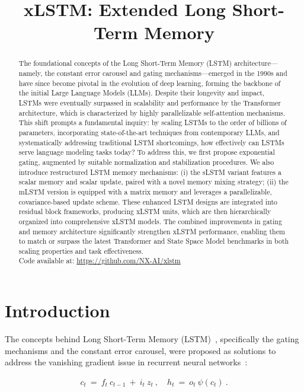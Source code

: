 \title{xLSTM: Extended Long Short-Term Memory}

\begin{abstract}
The foundational concepts of the Long Short-Term Memory (LSTM) architecture—namely, the constant error carousel and gating mechanisms—emerged in the 1990s and have since become pivotal in the evolution of deep learning, forming the backbone of the initial Large Language Models (LLMs). Despite their longevity and impact, LSTMs were eventually surpassed in scalability and performance by the Transformer architecture, which is characterized by highly parallelizable self-attention mechanisms. This shift prompts a fundamental inquiry: by scaling LSTMs to the order of billions of parameters, incorporating state-of-the-art techniques from contemporary LLMs, and systematically addressing traditional LSTM shortcomings, how effectively can LSTMs serve language modeling tasks today? To address this, we first propose exponential gating, augmented by suitable normalization and stabilization procedures. We also introduce restructured LSTM memory mechanisms: (i) the sLSTM variant features a scalar memory and scalar update, paired with a novel memory mixing strategy; (ii) the mLSTM version is equipped with a matrix memory and leverages a parallelizable, covariance-based update scheme. These enhanced LSTM designs are integrated into residual block frameworks, producing xLSTM units, which are then hierarchically organized into comprehensive xLSTM models. The combined improvements in gating and memory architecture significantly strengthen xLSTM performance, enabling them to match or surpass the latest Transformer and State Space Model benchmarks in both scaling properties and task effectiveness.\\
Code available at: \url{https://github.com/NX-AI/xlstm}
\end{abstract}

\section{Introduction}
\label{sec:intro}

The concepts behind Long Short-Term Memory (LSTM)~\citep{Hochreiter:91,Hochreiter:97nips,Hochreiter:97}, specifically the gating mechanisms and the constant error carousel, were proposed as solutions to address the vanishing gradient issue in recurrent neural networks~\citep{Hochreiter:91,Hochreiter:00book}:

\begin{align}
\label{eq:lstm_idea}
  c_t \ = \ f_t \ c_{t-1} \ + \ 
          i_t \  z_t \ , \quad  
          h_t \ = \ o_t \ \psi({c_t}) \ . 
\end{align}

